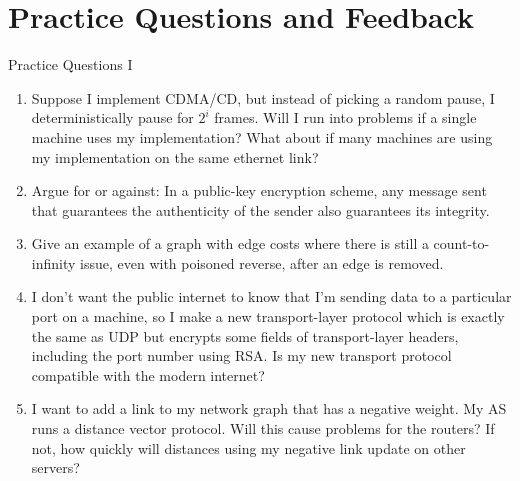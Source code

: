 \documentclass{beamer}
\begin{document}
\section{Practice Questions and Feedback}
\begin{frame}[t]{Practice Questions I}
    \begin{enumerate}
        \item Suppose I implement CDMA/CD, but instead of picking a random pause, I deterministically pause for $2^i$ frames. Will I run into problems if a single machine uses my implementation? What about if many machines are using my implementation on the same ethernet link?
        \pause\item Argue for or against: In a public-key encryption scheme, any message sent that guarantees the authenticity of the sender also guarantees its integrity.
        \pause\item Give an example of a graph with edge costs where there is still a count-to-infinity issue, even with poisoned reverse, after an edge is removed.
        \pause\item I don't want the public internet to know that I'm sending data to a particular port on a machine, so I make a new transport-layer protocol which is exactly the same as UDP but encrypts some fields of transport-layer headers, including the port number using RSA. Is my new transport protocol compatible with the modern internet?
        \pause\item I want to add a link to my network graph that has a negative weight. My AS runs a distance vector protocol. Will this cause problems for the routers? If not, how quickly will distances using my negative link update on other servers?
    \end{enumerate}
\end{frame}
\end{document}
